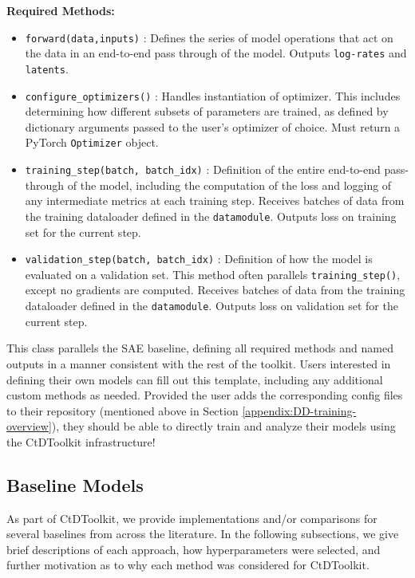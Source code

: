 \documentclass{article}
\begin{document}
\textbf{Required Methods: }
\vspace{-0.2cm}
\begin{itemize}
    \item \texttt{forward(data,inputs)} : Defines the series of model operations that act on the data in an end-to-end pass through of the model. Outputs \texttt{log-rates} and \texttt{latents}.
    \item \texttt{configure\_optimizers()} : Handles instantiation of optimizer. This includes determining how different subsets of parameters are trained, as defined by dictionary arguments passed to the user's optimizer of choice. Must return a PyTorch \texttt{Optimizer} object.
    \item \texttt{training\_step(batch, batch\_idx)} : Definition of the entire end-to-end pass-through of the model, including the computation of the loss and logging of any intermediate metrics at each training step. Receives batches of data from the training dataloader defined in the \texttt{datamodule}. Outputs loss on training set for the current step.
    \item \texttt{validation\_step(batch, batch\_idx)} : Definition of how the model is evaluated on a validation set. This method often parallels \texttt{training\_step()}, except no gradients are computed. Receives batches of data from the training dataloader defined in the \texttt{datamodule}. Outputs loss on validation set for the current step.
\end{itemize}

This class parallels the SAE baseline, defining all required methods and named outputs in a manner consistent with the rest of the toolkit. Users interested in defining their own models can fill out this template, including any additional custom methods as needed. Provided the user adds the corresponding config files to their repository (mentioned above in Section \ref{appendix:DD-training-overview}), they should be able to directly train and analyze their models using the CtDToolkit infrastructure!


\subsection{Baseline Models \label{appendix:DD-default-models}}
As part of CtDToolkit, we provide implementations and/or comparisons for several baselines from across the literature. In the following subsections, we give brief descriptions of each approach, how hyperparameters were selected, and further motivation as to why each method was considered for CtDToolkit.
\end{document}

